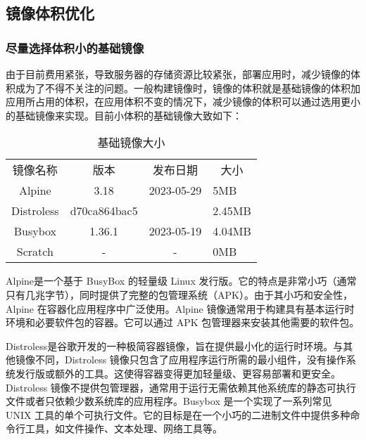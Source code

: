 \documentclass[../../../dolphin-book-2023.tex]{subfiles}
\begin{document}
\subsection{镜像体积优化}



\subsubsection{尽量选择体积小的基础镜像}

由于目前费用紧张，导致服务器的存储资源比较紧张，部署应用时，减少镜像的体积成为了不得不关注的问题。一般构建镜像时，镜像的体积就是基础镜像的体积加应用所占用的体积，在应用体积不变的情况下，减少镜像的体积可以通过选用更小的基础镜像来实现。目前小体积的基础镜像大致如下：

\begin{table}[htbp]
	\caption{基础镜像大小}
	\label{table:baseimagesize}
	\begin{center}
		\begin{tabular}{cccp{1cm}}
			\hline
			\multirow{1}{*}{镜像名称}
			& \multicolumn{1}{c}{版本}
            & \multicolumn{1}{c}{发布日期}
            & \multicolumn{1}{c}{大小}\\			
			\cline{1-4}
            Alpine & 3.18 & 2023-05-29 & 5MB \\ 
            \hline
            Distroless & d70ca864bac5 & & 2.45MB \\ 
			\hline
			Busybox & 1.36.1 & 2023-05-19 & 4.04MB \\
			\hline
            Scratch & - & - & 0MB \\
			\hline
		\end{tabular}	
	\end{center}
\end{table}

Alpine是一个基于 BusyBox 的轻量级 Linux 发行版。它的特点是非常小巧（通常只有几兆字节），同时提供了完整的包管理系统（APK）。由于其小巧和安全性，Alpine 在容器化应用程序中广泛使用。Alpine 镜像通常用于构建具有基本运行时环境和必要软件包的容器。它可以通过 APK 包管理器来安装其他需要的软件包。

Distroless是谷歌开发的一种极简容器镜像，旨在提供最小化的运行时环境。与其他镜像不同，Distroless 镜像只包含了应用程序运行所需的最小组件，没有操作系统发行版或额外的工具。这使得容器变得更加轻量级、更容易部署和更安全。Distroless 镜像不提供包管理器，通常用于运行无需依赖其他系统库的静态可执行文件或者只依赖少数系统库的应用程序。Busybox 是一个实现了一系列常见 UNIX 工具的单个可执行文件。它的目标是在一个小巧的二进制文件中提供多种命令行工具，如文件操作、文本处理、网络工具等。
\end{document}
